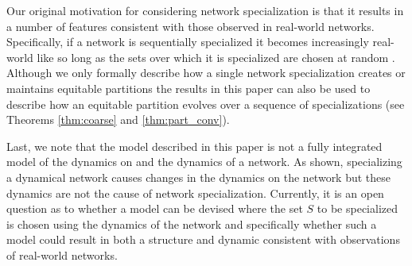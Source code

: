 \documentclass[12pt]{thesis}
\begin{document}
Our original motivation for considering network specialization is that it results in a number of features consistent with those observed in real-world networks. Specifically, if a network is sequentially specialized it becomes increasingly real-world like so long as the sets over which it is specialized are chosen at random \cite{8}. Although we only formally describe how a single network specialization creates or maintains equitable partitions the results in this paper can also be used to describe how an equitable partition evolves over a sequence of specializations (see Theorems \ref{thm:coarse} and \ref{thm:part_conv}).

Last, we note that the model described in this paper is not a fully integrated model of the {dynamics on} and the {dynamics of} a network. As shown, specializing a dynamical network causes changes in the dynamics on the network but these dynamics are not the cause of network specialization. Currently, it is an open question as to whether a model can be devised where the set $S$ to be specialized is chosen using the dynamics of the network and specifically whether such a model could result in both a structure and dynamic consistent with observations of real-world networks.


\appendix

% 
% 
\end{document}

